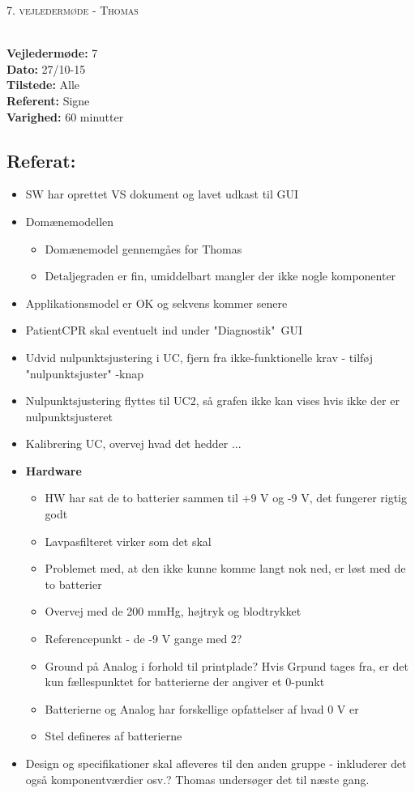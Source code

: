 \documentclass[a4paper,11pt,oneside]{memoir}
\begin{document}
\newpage


\begin{center} 
\huge{\textsc{7. vejledermøde - Thomas}}
\end{center}

\textbf{ }
\\
\textbf{Vejledermøde:} 7
\\
\textbf{Dato:} 27/10-15
\\
\textbf{Tilstede:} Alle
\\
\textbf{Referent:} Signe
\\
\textbf{Varighed:} 60 minutter
\\

\subsection{Referat:}
\begin{itemize}
\item SW har oprettet VS dokument og lavet udkast til GUI
\item Domænemodellen
\begin{itemize}
\item Domænemodel gennemgåes for Thomas
\item Detaljegraden er fin, umiddelbart mangler der ikke nogle komponenter
\end{itemize}
\item Applikationsmodel er OK og sekvens kommer senere 
\item PatientCPR skal eventuelt ind under "Diagnostik"\ GUI
\item Udvid nulpunktsjustering i UC, fjern fra ikke-funktionelle krav - tilføj "nulpunktsjuster"\- -knap
\item Nulpunktsjustering flyttes til UC2, så grafen ikke kan vises hvis ikke der er nulpunktsjusteret
\item Kalibrering UC, overvej hvad det hedder ...
\item \textbf{Hardware}
\begin{itemize}
\item HW har sat de to batterier sammen til +9 V og -9 V, det fungerer rigtig godt 
\item Lavpasfilteret virker som det skal
\item Problemet med, at den ikke kunne komme langt nok ned, er løst med de to batterier 
\item Overvej med de 200 mmHg, højtryk og blodtrykket
\item Referencepunkt - de -9 V gange med 2?
\item Ground på Analog i forhold til printplade? Hvis Grpund tages fra, er det kun fællespunktet for batterierne der angiver et 0-punkt
\item Batterierne og Analog har forskellige opfattelser af hvad 0 V er 
\item Stel defineres af batterierne 
\end{itemize}
\item Design og specifikationer skal afleveres til den anden gruppe - inkluderer det også komponentværdier osv.? Thomas undersøger det til næste gang.
\end{itemize}
\end{document}
